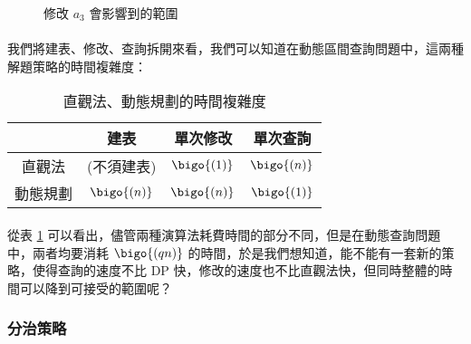 \documentclass[12pt,a4paper,oneside]{report}
\begin{document}
\begin{CJK}{UTF8}{bkai}
\begin{figure}[h]
\centering
{}
\caption{修改 $a_3$ 會影響到的範圍}
\label{tree:fig:rsq:dynamic}
\end{figure}

\paragraph{}我們將建表、修改、查詢拆開來看，我們可以知道在動態區間查詢問題中，這兩種解題策略的時間複雜度：

\begin{table}[h]
\centering
\begin{tabular}{c|ccc}
& 建表 & 單次修改 & 單次查詢\\
\hline
\hline
直觀法 & (不須建表) & $\bigo{(1)}$ & $\bigo{(n)}$\\
動態規劃 & $\bigo{(n)}$ & $\bigo{(n)}$ & $\bigo{(1)}$
\end{tabular}
\caption{直觀法、動態規劃的時間複雜度}
\label{tree:tab:rsq:time}
\end{table}

\paragraph{}從表 \ref{tree:tab:rsq:time} 可以看出，儘管兩種演算法耗費時間的部分不同，但是在動態查詢問題中，兩者均要消耗 $\bigo{(qn)}$ 的時間，於是我們想知道，能不能有一套新的策略，使得查詢的速度不比 DP 快，修改的速度也不比直觀法快，但同時整體的時間可以降到可接受的範圍呢？

\subsubsection{分治策略}


\end{CJK}
\end{document}
